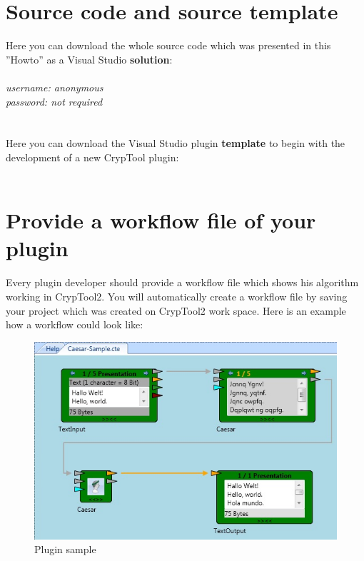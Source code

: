 \section{Source code and source template}\label{sec:SourceCodeAndSourceTemplate}
Here you can download the whole source code which was presented in this ''Howto'' as a Visual Studio \textbf{solution}:\\\\
\textit{username: anonymous\\
password: not required\\}
\\\\
Here you can download the Visual Studio plugin \textbf{template} to begin with the development of a new CrypTool plugin:\\\\
\clearpage
\section{Provide a workflow file of your plugin}\label{ProvideAWorkflowFileOfYourPlugin}
Every plugin developer should provide a workflow file which shows his algorithm working in CrypTool2. You will automatically create a workflow file by saving your project which was created on CrypTool2 work space. Here is an example how a workflow could look like:
\begin{figure}[h]
	\centering
		\includegraphics{figures/sample.jpg}
	\caption{Plugin sample}
	\label{fig:sample}
\end{figure}